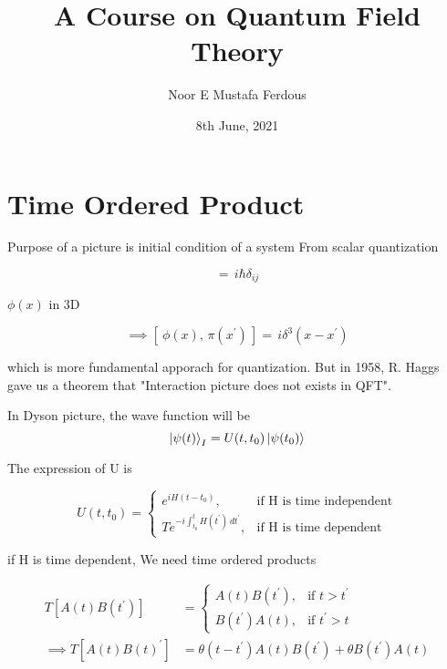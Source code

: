 \documentclass[12pt, letterpaper]{article}
\author{Noor E Mustafa Ferdous}
\title {A Course on Quantum Field Theory}
\date{8th June, 2021}
\newcommand*{\1}{\hspace{1pt}}
\begin{document}
    \maketitle

    \section*{Time Ordered Product}

    Purpose of a picture is initial condition of a system 
    From scalar quantization 

    \begin{equation}
        [\ \tensor \phi{_i}, \, \pi{_j} \, ] = \, i\hbar \delta{_{ij}}
    \end{equation}
    
     $\phi (x)$ in 3D
    
    \begin{equation}
        \implies    [\ \phi(x), \, \pi(x ^{\prime}) \, ] = \, i \delta ^{3}(x-x ^{\prime})
    \end{equation}

    which is more fundamental apporach for quantization. But in 1958, R. Haggs gave us a theorem that "Interaction
    picture does not exists in QFT".

    In Dyson picture, the wave function will be
    \begin{equation}
        \ket{\psi (t)} _{I} = U(t,t_{0})\ket{\psi (t_{0})}
    \end{equation}
    
    The expression of U is 

    \begin{equation*}
        U(t,t_{0})  = 
            \begin{cases}
            e^{iH(t-t_{0})}, & \text {if H is time independent} \\
            Te^{-i\int_{t{_0}}^{t} H(t^{\prime}) \,dt^{\prime} }, & \text {if H is time dependent}
            \end{cases}
    \end{equation*}

    if H is time dependent, We need time ordered products
    
    \begin{equation}
        \begin{split}
            T[A(t)B(t^{\prime})] & =
            \begin{cases}
                A(t)B(t^{\prime}), & \text{if } t > t^{\prime} \\
                B(t^{\prime})A(t), & \text{if } t^{\prime} > t
            \end{cases} \\
            \implies T[A(t)B(t)^{\prime}] & = \theta (t-t^{\prime})A(t)B(t^{\prime}) + \theta B(t^{\prime})A(t)
        \end{split}
    \end{equation}
\end{document}
